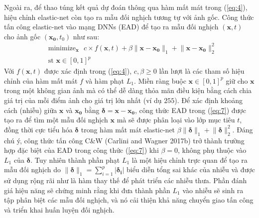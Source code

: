 Ngoài ra, để thao túng kết quả dự đoán thông qua hàm mất mát trong (\ref{eq:4}), hiệu chỉnh 
elastic-net còn tạo ra mẫu đối nghịch tương tự với ảnh gốc. Công thức tấn công elastic-net
vào mạng DNNs (EAD) để tạo ra mẫu đối nghịch $(\mathbf{x},t)$ cho ảnh gốc $(\mathbf{x_0}, t_0)$ như sau:
\begin{equation}
    \label{eq:7}
    \begin{split}
    &\text{minimize}_{\mathbf{x}} \text{ }
    c \times f(\mathbf{x}, t) + \beta \lVert \mathbf{x} - \mathbf{x_0} \rVert_1
    + \lVert \mathbf{x} - \mathbf{x_0} \rVert_2^2 \\
    &\text{st   } \mathbf{x} \in [0,1]^p
    \end{split}
\end{equation}
Với $f(\mathbf{x},t)$ được xác định trong (\ref{eq:4}), $c, \beta \geq 0$ lần lượt 
là các tham số  hiệu chỉnh của hàm mất mát $f$ và hàm phạt $L_1$. Miền ràng buộc 
$\mathbf{x} \in [0,1]^p$ giữ cho $\mathbf{x}$ trong một không gian ảnh mà có thể dễ dàng thỏa mãn điều kiện
bằng cách chia giá trị của mỗi điểm ảnh cho giá trị lớn nhất (ví dụ $255$). Để xác định khoảng 
cách (nhiễu) giữa $\mathbf{x}$ và $\mathbf{x_0}$ bằng $\mathbf{\delta} = \mathbf{x} - \mathbf{x_0}$,
công thức EAD trong (\ref{eq:7}) được tạo ra để tìm một mẫu đối nghịch $\mathbf{x}$ mà sẽ 
được phân loại vào lớp mục tiêu $t$, đồng thời cực tiểu hóa $\mathbf{\delta}$ trong hàm
mất mát elastic-net $\beta \lVert \mathbf{\delta} \rVert_1 + \lVert \mathbf{\delta} \rVert_2^2$.
Đáng chú ý, công thức tấn công C\&W (Carlini and Wagner 2017b) trở thành trường hợp đặc biệt 
của EAD trong công thức (\ref{eq:7}) khi $\beta = 0$, không phụ thuộc vào $L_1$ của $\mathbf{\delta}$.
Tuy nhiên thành phần phạt $L_1$ là một hiệu chỉnh trực quan để tạo ra mẫu đối nghịch do 
$\lVert \mathbf{\delta} \rVert_1 = \sum_{i=1}^p |\mathbf{\delta_i}|$ biểu diễn tổng sai khác
của nhiễu và được sử dụng rộng rãi như là hàm thay thế để phát triển các nhiễu thưa. 
Phần đánh giá hiệu năng sẽ chứng minh rằng khi đưa thành phần $L_1$ vào nhiễu sẽ sinh ra 
tập phân biệt các mẫu đối nghịch, và nó cải thiện khả năng chuyển giao tấn công và triển 
khai huấn luyện đối nghịch.

